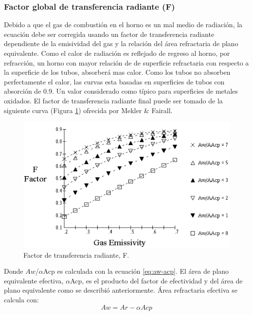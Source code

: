 \subsubsection{Factor global de transferencia radiante (F)}
\par Debido a que el gas de combustión en el horno es un mal medio de radiación, la ecuación debe ser corregida usando un factor de transferencia radiante dependiente de la emisividad del gas y la relación del área refractaria de plano equivalente. Como el calor de radiación es reflejado de regreso al horno, por refracción, un horno con mayor relación de de superficie refractaria con respecto a la superficie de los tubos, absorberá mas calor. Como los tubos no absorben perfectamente el calor, las curvas esta basadas en superficies de tubos con absorción de 0.9. Un valor considerado como típico para superficies de metales oxidados. El factor de transferencia radiante final puede ser tomado de la siguiente curva (Figura \ref{fig:f}) ofrecida por Mekler \& Fairall\cite{bib:mekler}.
\begin{figure}[hbt]
\begin{center}
\includegraphics[scale=0.45]{images/f}
\caption[Factor de transferencia radiante, F]{Factor de transferencia radiante, F.\cite{bib:mekler}}
\label{fig:f}
\end{center}
\end{figure}
\par Donde $Aw$/$\alpha$Acp es calculada con la ecuación \ref{eq:aw-acp}. El área de plano equivalente efectiva, $\alpha$Acp, es el producto del factor de efectividad y del área de plano equivalente como se describió anteriormente. Área refractaria efectiva se calcula con:
\begin{equation}
Aw = Ar - \alpha Acp
\end{equation}
